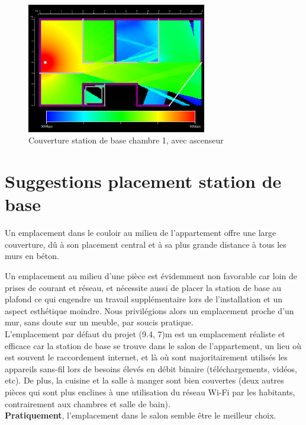 \begin{figure}[H]
    \centering
    \includegraphics[width=0.7\textwidth]{latex/images/highres-chambre1-with-lift.png}
    \caption{Couverture station de base chambre 1, avec ascenseur}
    \label{fig:simu-emplacement-chambre1-avecasc}
\end{figure}


\section{Suggestions placement station de base}

Un emplacement dans le couloir au milieu de l'appartement offre une large couverture, dû à son placement central et à sa plus grande distance à tous les murs en béton.

Un emplacement au milieu d'une pièce est évidemment non favorable car loin de prises de courant et réseau, et nécessite aussi de placer la station de base au plafond ce qui engendre un travail supplémentaire lors de l'installation et un aspect esthétique moindre. Nous privilégions alors un emplacement proche d'un mur, sans doute sur un meuble, par soucis pratique.\\

L'emplacement par défaut du projet (9.4, 7)m est un emplacement réaliste et efficace car la station de base se trouve dans le salon de l'appartement, un lieu où est souvent le raccordement internet, et là où sont majoritairement utilisés les appareils sans-fil lors de besoins élevés en débit binaire (téléchargements, vidéos, etc). De plus, la cuisine et la salle à manger sont bien couvertes (deux autres pièces qui sont plus enclines à une utilisation du réseau Wi-Fi par les habitants, contrairement aux chambres et salle de bain).\\

\textbf{Pratiquement}, l'emplacement dans le salon semble être le meilleur choix.

